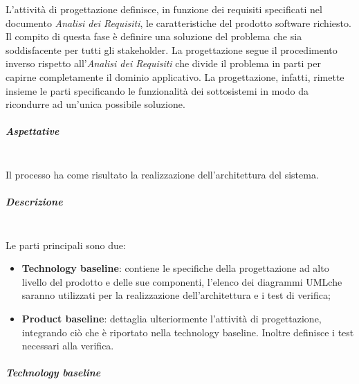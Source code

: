 L'attività di progettazione definisce, in funzione dei requisiti specificati 
nel documento \textit{Analisi dei Requisiti}, le caratteristiche del prodotto 
software richiesto. Il compito di questa fase è definire una soluzione del 
problema che sia soddisfacente per tutti gli stakeholder. La progettazione segue 
il procedimento inverso rispetto all'\textit{Analisi dei Requisiti} che divide 
il problema in parti per capirne completamente il dominio applicativo. La 
progettazione, infatti, rimette insieme le parti specificando le funzionalità 
dei sottosistemi in modo da ricondurre ad un'unica possibile soluzione. \newline 


\subparagraph{Aspettative} \mbox{}\\

Il processo ha come risultato la realizzazione dell'architettura del sistema. 
\newline

\subparagraph{Descrizione}  \mbox{}\\

Le parti principali sono due:
	\begin{itemize}
		\item \textbf{Technology baseline}: contiene le specifiche della 
			progettazione ad alto livello del prodotto e delle sue componenti, l'elenco dei 
			diagrammi UML\glosp che saranno utilizzati per la realizzazione 
			dell'architettura e i test di verifica;
		\item \textbf{Product baseline}: dettaglia ulteriormente l'attività di 
			progettazione, integrando ciò che è riportato nella technology baseline. Inoltre 
			definisce i test necessari alla verifica. \newline
	\end{itemize}


\subparagraph{Technology baseline} \mbox{}\\

